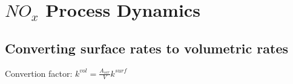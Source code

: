 \section{$NO_x$ Process Dynamics}


\subsection{Converting surface rates to volumetric rates}

 Convertion factor: $k^{vol} = \frac{A_{scr}}{V} k^{surf}$
